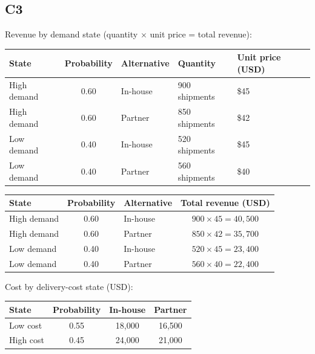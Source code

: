 \begin{ExamProblems}
		\subsection*{C3}
		Revenue by demand state (quantity $\times$ unit price = total revenue):
		\begin{center}
			\begin{tabular}{l c l l l}
				\toprule
				State & Probability & Alternative & Quantity & Unit price (USD) \\
				\midrule
				High demand & 0.60 & In-house & 900 shipments & \$45 \\
				High demand & 0.60 & Partner & 850 shipments & \$42 \\
				Low demand & 0.40 & In-house & 520 shipments & \$45 \\
				Low demand & 0.40 & Partner & 560 shipments & \$40 \\
				\bottomrule
			\end{tabular}
		\end{center}
		\begin{center}
			\begin{tabular}{l c l c}
				\toprule
				State & Probability & Alternative & Total revenue (USD) \\
				\midrule
				High demand & 0.60 & In-house & $900 \times 45 = 40{,}500$ \\
				High demand & 0.60 & Partner & $850 \times 42 = 35{,}700$ \\
				Low demand & 0.40 & In-house & $520 \times 45 = 23{,}400$ \\
				Low demand & 0.40 & Partner & $560 \times 40 = 22{,}400$ \\
				\bottomrule
			\end{tabular}
		\end{center}
		
		Cost by delivery-cost state (USD):
		\begin{center}
			\begin{tabular}{l c c c}
				\toprule
				State & Probability & In-house & Partner \\
				\midrule
				Low cost & 0.55 & 18{,}000 & 16{,}500 \\
				High cost & 0.45 & 24{,}000 & 21{,}000 \\
				\bottomrule
			\end{tabular}
		\end{center}
		

\end{ExamProblems}

